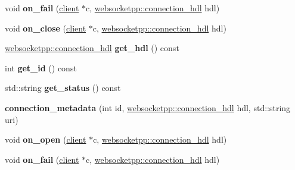 \begin{DoxyCompactItemize}
\item 
void {\bfseries on\+\_\+fail} (\hyperlink{classwebsocketpp_1_1client}{client} $\ast$c, \hyperlink{namespacewebsocketpp_a6b3d26a10ee7229b84b776786332631d}{websocketpp\+::connection\+\_\+hdl} hdl)\hypertarget{classconnection__metadata_a1c2e652001b8306207beafe17b1a52ed}{}\label{classconnection__metadata_a1c2e652001b8306207beafe17b1a52ed}

\item 
void {\bfseries on\+\_\+close} (\hyperlink{classwebsocketpp_1_1client}{client} $\ast$c, \hyperlink{namespacewebsocketpp_a6b3d26a10ee7229b84b776786332631d}{websocketpp\+::connection\+\_\+hdl} hdl)\hypertarget{classconnection__metadata_ac297cf7710d8d510ef383b7395222ce5}{}\label{classconnection__metadata_ac297cf7710d8d510ef383b7395222ce5}

\item 
\hyperlink{namespacewebsocketpp_a6b3d26a10ee7229b84b776786332631d}{websocketpp\+::connection\+\_\+hdl} {\bfseries get\+\_\+hdl} () const\hypertarget{classconnection__metadata_a76a6a10e9192cd0ca03e2a2539cf4549}{}\label{classconnection__metadata_a76a6a10e9192cd0ca03e2a2539cf4549}

\item 
int {\bfseries get\+\_\+id} () const\hypertarget{classconnection__metadata_a3f71fbb092ec54e496464e42d960a22d}{}\label{classconnection__metadata_a3f71fbb092ec54e496464e42d960a22d}

\item 
std\+::string {\bfseries get\+\_\+status} () const\hypertarget{classconnection__metadata_aefe28a6b0b27076c685d66727e0f0a9d}{}\label{classconnection__metadata_aefe28a6b0b27076c685d66727e0f0a9d}

\item 
{\bfseries connection\+\_\+metadata} (int id, \hyperlink{namespacewebsocketpp_a6b3d26a10ee7229b84b776786332631d}{websocketpp\+::connection\+\_\+hdl} hdl, std\+::string uri)\hypertarget{classconnection__metadata_ab73db2e336676ec4efa4d4dc5051958f}{}\label{classconnection__metadata_ab73db2e336676ec4efa4d4dc5051958f}

\item 
void {\bfseries on\+\_\+open} (\hyperlink{classwebsocketpp_1_1client}{client} $\ast$c, \hyperlink{namespacewebsocketpp_a6b3d26a10ee7229b84b776786332631d}{websocketpp\+::connection\+\_\+hdl} hdl)\hypertarget{classconnection__metadata_ab10d997bd75d9e98b235b7e97b84b85a}{}\label{classconnection__metadata_ab10d997bd75d9e98b235b7e97b84b85a}

\item 
void {\bfseries on\+\_\+fail} (\hyperlink{classwebsocketpp_1_1client}{client} $\ast$c, \hyperlink{namespacewebsocketpp_a6b3d26a10ee7229b84b776786332631d}{websocketpp\+::connection\+\_\+hdl} hdl)\hypertarget{classconnection__metadata_a1c2e652001b8306207beafe17b1a52ed}{}\label{classconnection__metadata_a1c2e652001b8306207beafe17b1a52ed}


\end{DoxyCompactItemize}
